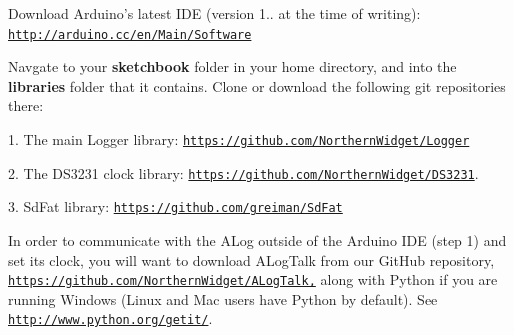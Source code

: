 \begin{DoxyEnumerate}
\item Download Arduino’s latest I\+DE (version 1.. at the time of writing)\+: \href{http://arduino.cc/en/Main/Software}{\tt http\+://arduino.\+cc/en/\+Main/\+Software}
\item Navgate to your {\bfseries sketchbook} folder in your home directory, and into the {\bfseries libraries} folder that it contains. Clone or download the following git repositories there\+:
\end{DoxyEnumerate}
\begin{DoxyEnumerate}
\item 1. The main Logger library\+: \href{https://github.com/NorthernWidget/Logger}{\tt https\+://github.\+com/\+Northern\+Widget/\+Logger}
\end{DoxyEnumerate}
\begin{DoxyEnumerate}
\item 2. The D\+S3231 clock library\+: \href{https://github.com/NorthernWidget/DS3231}{\tt https\+://github.\+com/\+Northern\+Widget/\+D\+S3231}.
\end{DoxyEnumerate}
\begin{DoxyEnumerate}
\item 3. Sd\+Fat library\+: \href{https://github.com/greiman/SdFat}{\tt https\+://github.\+com/greiman/\+Sd\+Fat}
\item In order to communicate with the A\+Log outside of the Arduino I\+DE (step 1) and set its clock, you will want to download A\+Log\+Talk from our Git\+Hub repository, \href{https://github.com/NorthernWidget/ALogTalk,}{\tt https\+://github.\+com/\+Northern\+Widget/\+A\+Log\+Talk,} along with Python if you are running Windows (Linux and Mac users have Python by default). See \href{http://www.python.org/getit/}{\tt http\+://www.\+python.\+org/getit/}.
\end{DoxyEnumerate}

